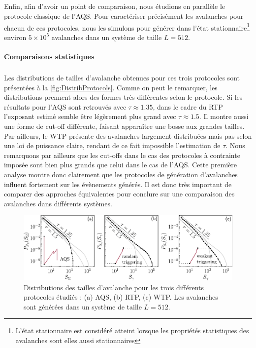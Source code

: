 \subparagraph{}Enfin, afin d'avoir un point de comparaison, nous étudions en parallèle le protocole classique de l'AQS. Pour caractériser précisément les avalanches pour chacun de ces protocoles, nous les simulons pour générer dans l'état stationnaire\footnote{L'état stationnaire est considéré atteint lorsque les propriétés statistiques des avalanches sont elles aussi stationnaires} environ $5\times 10^5$ avalanches dans un système de taille $L=512$.

\paragraph{Comparaisons statistiques}

\subparagraph{}Les distributions de tailles d'avalanche obtenues pour ces trois protocoles sont présentées à la \autoref{fig:DistribProtocols}. Comme on peut le remarquer, les distributions prennent alors des formes très différentes selon le protocole. Si les résultats pour l'AQS sont retrouvés avec $\tau\approx 1.35$, dans le cadre du RTP l'exposant estimé semble être légèrement plus grand avec $\tau \approx 1.5$. Il montre aussi une forme de cut-off différente, faisant apparaître une bosse aux grandes tailles. Par ailleurs, le WTP présente des avalanches largement distribuées mais pas selon une loi de puissance claire, rendant de ce fait impossible l'estimation de $\tau$. Nous remarquons par ailleurs que les cut-offs dans le cas des protocoles à contrainte imposée sont bien plus grands que celui dans le cas de l'AQS. Cette première analyse montre donc clairement que les protocoles de génération d'avalanches influent fortement sur les évènements générés. Il est donc très important de comparer des approches équivalentes pour conclure sur une comparaison des avalanches dans différents systèmes.

\begin{figure}[h]
	\centering
	\includegraphics[width=\textwidth]{Chapitre4/Figures/Avalanches/Comparaison_Distrib.pdf}
	\caption{Distributions des tailles d'avalanche pour les trois différents protocoles étudiés : (a) AQS, (b) RTP, (c) WTP. Les avalanches sont générées dans un système de taille $L=512$.}
	\label{fig:DistribProtocols}
\end{figure}

